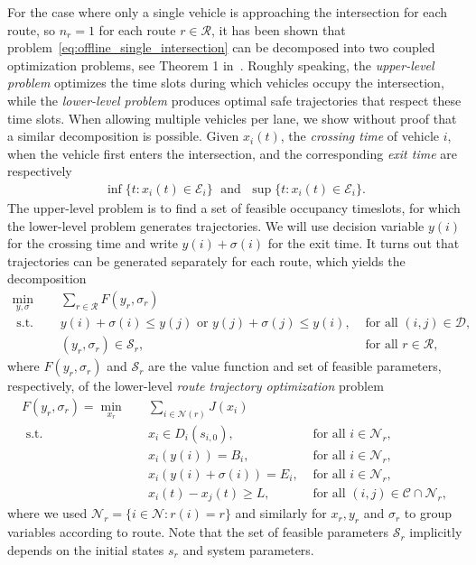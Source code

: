 \documentclass[a4paper]{article}
\theoremstyle{definition}
\theoremstyle{plain}
\begin{document}
For the case where only a single vehicle is approaching the intersection for
each route, so $n_{r} = 1$ for each route $r \in \mathcal{R}$, it has been shown
that problem~\eqref{eq:offline_single_intersection} can be decomposed into two coupled optimization problems, see
Theorem 1 in~\cite{hultApproximateSolutionOptimal2015}. Roughly speaking, the \textit{upper-level problem} optimizes the time
slots during which vehicles occupy the intersection, while the \textit{lower-level problem}
produces optimal safe trajectories that respect these time slots.
%
When allowing multiple vehicles per lane, we show without proof that a similar
decomposition is possible.
%
Given $x_{i}(t)$, the \textit{crossing time} of vehicle $i$, when the vehicle
first enters the intersection, and the corresponding \textit{exit time} are respectively
\begin{align}
  \inf \{ t: x_{i}(t) \in \mathcal{E}_{i} \}  \; \text{ and } \; \sup \{ t: x_{i}(t) \in \mathcal{E}_{i} \} .
\end{align}
%
The upper-level problem is to find a set of feasible occupancy timeslots, for
which the lower-level problem generates trajectories. We will use decision
variable $y(i)$ for the crossing time and write $y(i) + \sigma(i)$ for the exit
time. It turns out that trajectories can be generated separately for each route,
which yields the decomposition
%
\begin{subequations}
\begin{align}
  \min_{y, \sigma} \quad & \sum_{r \in \mathcal{R}} F(y_{r}, \sigma_{r}) \\
  \text{ s.t. } \quad & y(i) + \sigma(i) \leq y(j) \text{ or } y(j) + \sigma(j) \leq y(i), & \text{ for all } (i, j) \in \mathcal{D} , \\
  & (y_{r}, \sigma_{r}) \in \mathcal{S}_{r} , & \text{ for all } r \in \mathcal{R} ,
\end{align}
\end{subequations}
where $F(y_{r}, \sigma_{r})$ and $\mathcal{S}_{r}$ are the value function and
set of feasible parameters, respectively, of the lower-level \textit{route trajectory optimization}
problem
\begin{subequations}
\begin{align}
  F(y_{r}, \sigma_{r}) = \min_{x_{r}} \quad & \sum_{i \in \mathcal{N}(r)} J(x_{i}) \\
  \text{ s.t. } \quad & x_{i} \in D_{i}(s_{i,0}) , & \text{ for all } i \in \mathcal{N}_{r} , \\
  & x_{i}(y(i)) = B_{i} , & \text{ for all } i \in \mathcal{N}_{r} , \\
  & x_{i}(y(i) + \sigma(i)) = E_{i} , & \text{ for all } i \in \mathcal{N}_{r} , \\
  & x_{i}(t) - x_{j}(t) \geq L , & \text{ for all } (i, j) \in \mathcal{C} \cap \mathcal{N}_{r} ,
\end{align}
\end{subequations}
where we used $\mathcal{N}_{r} = \{ i \in \mathcal{N} : r(i) = r \}$ and
similarly for $x_{r}, y_{r}$ and $\sigma_{r}$ to group variables according to
route. Note that the set of feasible parameters $\mathcal{S}_{r}$ implicitly
depends on the initial states $s_{r}$ and system parameters.
\end{document}

